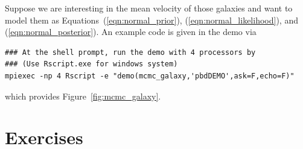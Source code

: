 Suppose we are interesting in the mean velocity of those galaxies and want to
model them as Equations~(\ref{eqn:normal_prior}), (\ref{eqn:normal_likelihood}),
and (\ref{eqn:normal_posterior}).
An example code is given in the  demo via
\begin{lstlisting}
### At the shell prompt, run the demo with 4 processors by
### (Use Rscript.exe for windows system)
mpiexec -np 4 Rscript -e "demo(mcmc_galaxy,'pbdDEMO',ask=F,echo=F)"
\end{lstlisting}
which provides Figure~\ref{fig:mcmc_galaxy}.







\section{Exercises}
\label{sec:mle_exercise}

